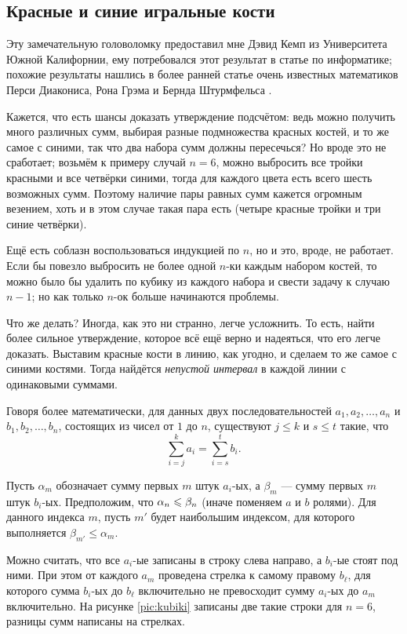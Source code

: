 \subsection*{Красные и синие игральные кости}

Эту замечательную головоломку предоставил мне Дэвид Кемп из Университета Южной Калифорнии, ему потребовался этот результат в статье по информатике;
похожие результаты нашлись в более ранней статье очень известных математиков Перси Диакониса, Рона Грэма и Бернда Штурмфельса \cite{diaconis-graham-sturmfels}.

Кажется, что есть шансы доказать утверждение подсчётом: ведь можно получить много различных сумм, выбирая разные подмножества красных костей, и то же самое с синими, так что два набора сумм должны пересечься?
Но вроде это не сработает;
возьмём к примеру случай $n = 6$,  можно выбросить все тройки красными и все четвёрки синими, тогда для каждого цвета есть всего шесть возможных сумм.
Поэтому наличие пары равных сумм кажется огромным везением,
хоть и в этом случае такая пара есть (четыре красные тройки и три синие четвёрки).

Ещё есть соблазн воспользоваться индукцией по $n$, но и это, вроде, не работает.
Если бы повезло выбросить не более одной $n$-ки каждым набором костей,
то можно было бы удалить по кубику из каждого набора и свести задачу к случаю $n-1$;
но как только $n$-ок больше начинаются проблемы.

Что же делать?
Иногда, как это ни странно, легче усложнить.
То есть, найти более сильное утверждение, которое всё ещё верно и надеяться, что его легче доказать.
Выставим красные кости в линию, как угодно, и сделаем то же самое с синими костями.
Тогда найдётся \emph{непустой интервал} в каждой линии с одинаковыми суммами.

Говоря более математически, для данных двух последовательностей  $a_1,a_2,\dots,a_n$ и $b_1,b_2,\dots,b_n$, состоящих из чисел от $1$ до $n$, существуют 
$j\le k$ и 
$s\le t$ такие, что 
\[\sum_{i=j}^ka_i=\sum_{i=s}^tb_i.\]

Пусть $\alpha_m$ обозначает сумму первых $m$ штук $a_i$-ых,
а $\beta_m$ --- сумму первых $m$ штук $b_i$-ых.
Предположим, что $\alpha_n\z\le \beta_n$ (иначе поменяем $a$ и $b$ ролями).
Для данного индекса $m$, пусть $m'$ будет наибольшим индексом, для которого выполняется $\beta_{m'}\le \alpha_m$.

Можно считать, что все $a_i$-ые записаны в строку слева направо, а $b_i$-ые стоят под ними.
При этом от каждого $a_m$ проведена стрелка к самому правому $b_\ell$, для которого сумма $b_i$-ых до $b_\ell$ включительно не превосходит сумму $a_i$-ых до $a_m$ включительно.
На рисунке \ref{pic:kubiki} записаны две такие строки для $n=6$,
разницы сумм написаны на стрелках.

